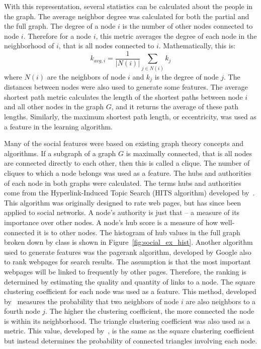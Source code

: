 \documentclass{article}
\begin{document}
With this representation, several statistics can be calculated about the people in the graph.  The average neighbor degree was calculated for both the partial and the full graph.  The degree of a node $i$ is the number of other nodes connected to node $i$.  Therefore for a node $i$, this metric averages the degree of each node in the neighborhood of $i$, that is all nodes connected to $i$.  Mathematically, this is:
\begin{equation}
k_{avg,i} = \frac{1}{|N(i)|}\sum_{j \in N(i)}k_j
\end{equation}
where $N(i)$ are the neighbors of node $i$ and $k_j$ is the degree of node $j$.
The distances between nodes were also used to generate some features.  The average shortest path metric calculates the length of the shortest paths between node $i$ and all other nodes in the graph $G$, and it returns the average of these path lengths.  Similarly, the maximum shortest path length, or eccentricity, was used as a feature in the learning algorithm.  

Many of the social features were based on existing graph theory concepts and algorithms. If a subgraph of a graph $G$ is maximally connected, that is all nodes are connected directly to each other, then this is called a clique.  The number of cliques to which a node belongs was used as a feature.  The hubs and authorities of each node in both graphs were calculated.  The terms hubs and authorities come from the Hyperlink-Induced Topic Search (HITS algorithm) developed by~\cite{kleinberg_hubs_1999}.  This algorithm was originally designed to rate web pages, but has since been applied to social networks. A node's authority is just that -- a measure of its importance over other nodes.  A node's hub score is a measure of how well-connected it is to other nodes.  The histogram of hub values in the full graph broken down by class is shown in Figure~\ref{fig:social_ex_hist}.  Another algorithm used to generate features was the pagerank algorithm, developed by Google 
\newline \cite{page_pagerank_1999} also to rank webpages for search results.  The assumption is that the most important webpages will be linked to frequently by other pages.  Therefore, the ranking is determined by estimating the quality and quantity of links to a node.  The square clustering coefficient for each node was used as a feature.  This method, developed by~\cite{lind_cycles_2005} measures the probability that two neighbors of node $i$ are also neighbors to a fourth node $j$.  The higher the clustering coefficient, the more connected the node is within its neighborhood.  The triangle clustering coefficient was also used as a metric.  This value, developed by~\cite{saramaki_generalizations_2007}, is the same as the square clustering coefficient but instead determines the probability of connected triangles involving each node.
\end{document}
